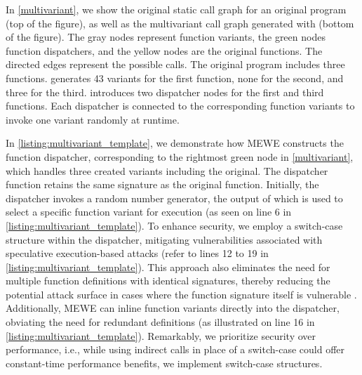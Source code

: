  


In \autoref{multivariant}, we show the original static call graph for an original program (top of the figure), as well as the multivariant call graph generated with \tool (bottom of the figure).
The gray nodes represent function variants, the green nodes function dispatchers, and the yellow nodes are the original functions.
The directed edges represent the possible calls.
The original program includes three functions. \tool generates 43 variants for the first function, none for the second, and three for the third. 
\tool introduces two dispatcher nodes for the first and third functions. Each dispatcher is connected to the corresponding function variants to invoke one variant randomly at runtime.



In \autoref{listing:multivariant_template}, we demonstrate how MEWE constructs the function dispatcher, corresponding to the rightmost green node in \autoref{multivariant}, which handles three created variants including the original. 
The dispatcher function retains the same signature as the original function. Initially, the dispatcher invokes a random number generator, the output of which is used to select a specific function variant for execution (as seen on line 6 in \autoref{listing:multivariant_template}). 
To enhance security, we employ a switch-case structure within the dispatcher, mitigating vulnerabilities associated with speculative execution-based attacks \cite{Narayan2021Swivel} (refer to lines 12 to 19 in \autoref{listing:multivariant_template}). 
This approach also eliminates the need for multiple function definitions with identical signatures, thereby reducing the potential attack surface in cases where the function signature itself is vulnerable \cite{veriwasm}.
Additionally, MEWE can inline function variants directly into the dispatcher, obviating the need for redundant definitions (as illustrated on line 16 in \autoref{listing:multivariant_template}). 
Remarkably, we prioritize security over performance, i.e., while using indirect calls in place of a switch-case could offer constant-time performance benefits, we implement switch-case structures.


\lstset{
    language=llvm,
    basicstyle=\footnotesize\ttfamily,
    columns=fullflexible,
    breaklines=true,
    numbers=none,
    stepnumber=1,
    firstnumber=1,
    float
}


